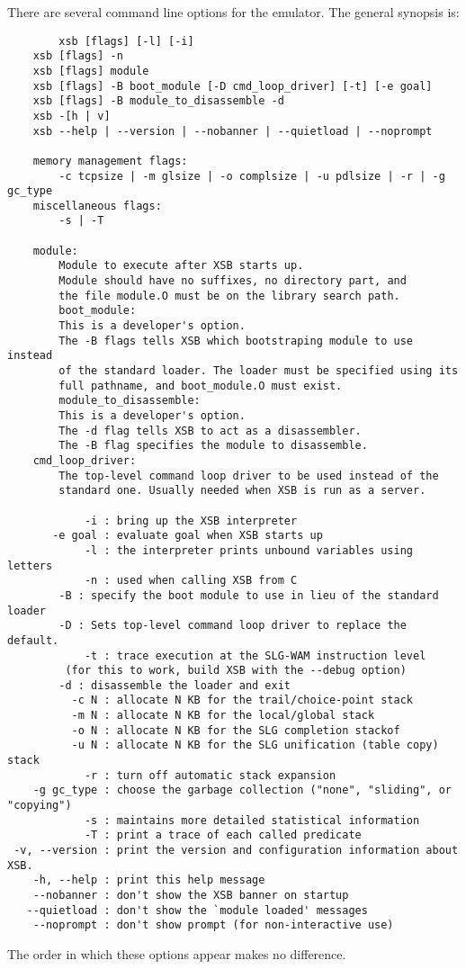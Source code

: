 There are several command line options for the emulator. The general 
synopsis is:
\begin{verbatim}
      	xsb [flags] [-l] [-i]
	xsb [flags] -n
	xsb [flags] module
	xsb [flags] -B boot_module [-D cmd_loop_driver] [-t] [-e goal]
	xsb [flags] -B module_to_disassemble -d
	xsb -[h | v]
	xsb --help | --version | --nobanner | --quietload | --noprompt

	memory management flags:
	    -c tcpsize | -m glsize | -o complsize | -u pdlsize | -r | -g gc_type
	miscellaneous flags:
	    -s | -T

	module:
	    Module to execute after XSB starts up.
	    Module should have no suffixes, no directory part, and
	    the file module.O must be on the library search path.
      	boot_module:
	    This is a developer's option.
	    The -B flags tells XSB which bootstraping module to use instead
	    of the standard loader. The loader must be specified using its
	    full pathname, and boot_module.O must exist.
    	module_to_disassemble:
	    This is a developer's option.
	    The -d flag tells XSB to act as a disassembler.
	    The -B flag specifies the module to disassemble.
	cmd_loop_driver:
	    The top-level command loop driver to be used instead of the
	    standard one. Usually needed when XSB is run as a server.

      	    -i : bring up the XSB interpreter
       -e goal : evaluate goal when XSB starts up
      	    -l : the interpreter prints unbound variables using letters
      	    -n : used when calling XSB from C
	    -B : specify the boot module to use in lieu of the standard loader
	    -D : Sets top-level command loop driver to replace the default.
      	    -t : trace execution at the SLG-WAM instruction level
		 (for this to work, build XSB with the --debug option)
	    -d : disassemble the loader and exit
      	  -c N : allocate N KB for the trail/choice-point stack
      	  -m N : allocate N KB for the local/global stack
      	  -o N : allocate N KB for the SLG completion stackof
      	  -u N : allocate N KB for the SLG unification (table copy) stack
      	    -r : turn off automatic stack expansion
    -g gc_type : choose the garbage collection ("none", "sliding", or "copying")
      	    -s : maintains more detailed statistical information
      	    -T : print a trace of each called predicate
 -v, --version : print the version and configuration information about XSB.
    -h, --help : print this help message
    --nobanner : don't show the XSB banner on startup
   --quietload : don't show the `module loaded' messages
    --noprompt : don't show prompt (for non-interactive use)

\end{verbatim}
The order in which these options appear makes no difference.


